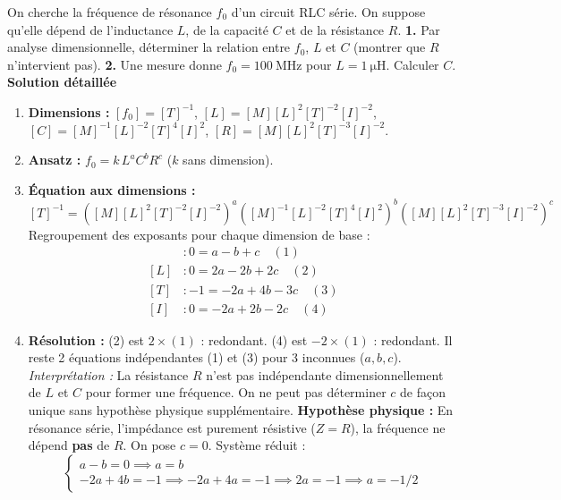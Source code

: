 \documentclass[11pt]{article}
\begin{document}
\begin{exoresolu}
    On cherche la fréquence de résonance $f_0$ d'un circuit RLC série. On suppose qu'elle dépend de l'inductance $L$, de la capacité $C$ et de la résistance $R$.
    \textbf{1.} Par analyse dimensionnelle, déterminer la relation entre $f_0$, $L$ et $C$ (montrer que $R$ n'intervient pas).
    \textbf{2.} Une mesure donne $f_0 = \SI{100}{\mega\hertz}$ pour $L = \SI{1}{\micro\henry}$. Calculer $C$.
    \tcblower
    \textbf{Solution détaillée}
    \begin{enumerate}
        \item \textbf{Dimensions :} $[f_0] = [T]^{-1}$, $[L] = [M][L]^2[T]^{-2}[I]^{-2}$, $[C] = [M]^{-1}[L]^{-2}[T]^4[I]^2$, $[R] = [M][L]^2[T]^{-3}[I]^{-2}$.
        \item \textbf{Ansatz :} $f_0 = k \, L^a C^b R^c$ ($k$ sans dimension).
        \item \textbf{Équation aux dimensions :}
              \[ [T]^{-1} = \left([M][L]^2[T]^{-2}[I]^{-2}\right)^a \left([M]^{-1}[L]^{-2}[T]^4[I]^2\right)^b \left([M][L]^2[T]^{-3}[I]^{-2}\right)^c \]
              Regroupement des exposants pour chaque dimension de base :
              \begin{align*}
                  [M] &: 0 = a - b + c \quad (1) \\
                  [L] &: 0 = 2a - 2b + 2c \quad (2) \\
                  [T] &: -1 = -2a + 4b - 3c \quad (3) \\
                  [I] &: 0 = -2a + 2b - 2c \quad (4)
              \end{align*}
        \item \textbf{Résolution :}
              (2) est $2\times(1)$ : redondant. (4) est $-2\times(1)$ : redondant.
              Il reste 2 équations indépendantes (1) et (3) pour 3 inconnues ($a, b, c$).
              \emph{Interprétation :} La résistance $R$ n'est pas indépendante dimensionnellement de $L$ et $C$ pour former une fréquence. On ne peut pas déterminer $c$ de façon unique sans hypothèse physique supplémentaire.
              \textbf{Hypothèse physique :} En résonance série, l'impédance est purement résistive ($Z=R$), la fréquence ne dépend \textbf{pas} de $R$. On pose $c=0$.
              Système réduit :
              \[\begin{cases}
                  a - b = 0 \implies a = b \\
                  -2a + 4b = -1 \implies -2a + 4a = -1 \implies 2a = -1 \implies a = -1/2

\end{cases}\]
\end{enumerate}
\end{exoresolu}
\end{document}
